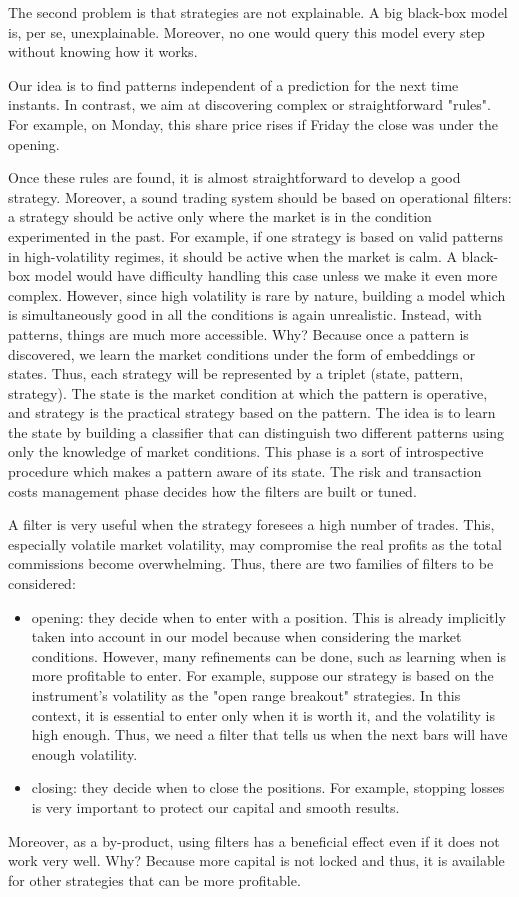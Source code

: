 \documentclass{article}[10pt]
\begin{document}
 The second problem is that strategies are not explainable. A big black-box model is, per se, unexplainable. Moreover, no one would query this model every step without knowing how it works.
 
 
Our idea is to find patterns independent of a prediction for the next time instants. In contrast, we aim at discovering complex or straightforward "rules". For example, on Monday, this share price rises if Friday the close was under the opening. 
 
 Once these rules are found, it is almost straightforward to develop a good strategy. Moreover, a sound trading system should be based on operational filters: a strategy should be active only where the market is in the condition experimented in the past. For example, if one strategy is based on valid patterns in high-volatility regimes, it should be active when the market is calm.
 A black-box model would have difficulty handling this case unless we make it even more complex. However, since high volatility is rare by nature, building a model which is simultaneously good in all the conditions is again unrealistic. 
 Instead, with patterns, things are much more accessible. Why? Because once a pattern is discovered, we learn the market conditions under the form of embeddings or states. Thus, each strategy will be represented by a triplet (state, pattern, strategy). The state is the market condition at which the pattern is operative, and strategy is the practical strategy based on the pattern.
 The idea is to learn the state by building a classifier that can distinguish two different patterns using only the knowledge of market conditions. This phase is a sort of introspective procedure which makes a pattern aware of its state.
 The risk and transaction costs management phase decides how the filters are built or tuned.
 
 A filter is very useful when the strategy foresees a high number of trades. This, especially volatile market volatility, may compromise the real profits as the total commissions become overwhelming.
 Thus, there are two families of filters to be considered:
 \begin{itemize}
    \item opening: they decide when to enter with a position. This is already implicitly taken into account in our model because when considering the market conditions. However, many refinements can be done, such as learning when is more profitable to enter. For example, suppose our strategy is based on the instrument's volatility as the "open range breakout" strategies. In this context, it is essential to enter only when it is worth it, and the volatility is high enough. Thus, we need a filter that tells us when the next bars will have enough volatility.
    \item closing: they decide when to close the positions. For example, stopping losses is very important to protect our capital and smooth results. 
 \end{itemize}
 Moreover, as a by-product, using filters has a beneficial effect even if it does not work very well. Why? Because more capital is not locked and thus, it is available for other strategies that can be more profitable.
 
\end{document}
